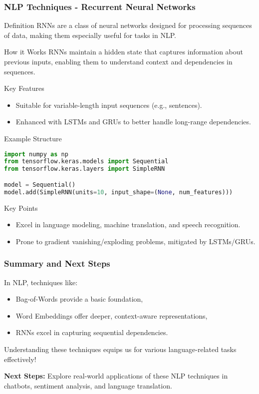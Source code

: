 \documentclass[aspectratio=169]{beamer}
\begin{document}
\begin{frame}[fragile]
  \frametitle{NLP Techniques - Recurrent Neural Networks}
  \begin{block}{Definition}
    RNNs are a class of neural networks designed for processing sequences of data, making them especially useful for tasks in NLP.
  \end{block}

  \begin{block}{How it Works}
    RNNs maintain a hidden state that captures information about previous inputs, enabling them to understand context and dependencies in sequences.
  \end{block}

  \begin{block}{Key Features}
    \begin{itemize}
      \item Suitable for variable-length input sequences (e.g., sentences).
      \item Enhanced with LSTMs and GRUs to better handle long-range dependencies.
    \end{itemize}
  \end{block}

  \begin{block}{Example Structure}
    \begin{lstlisting}[language=Python]
import numpy as np
from tensorflow.keras.models import Sequential
from tensorflow.keras.layers import SimpleRNN

model = Sequential()
model.add(SimpleRNN(units=10, input_shape=(None, num_features)))
    \end{lstlisting}
  \end{block}

  \begin{block}{Key Points}
    \begin{itemize}
      \item Excel in language modeling, machine translation, and speech recognition.
      \item Prone to gradient vanishing/exploding problems, mitigated by LSTMs/GRUs.
    \end{itemize}
  \end{block}
\end{frame}

\begin{frame}[fragile]
  \frametitle{Summary and Next Steps}
  In NLP, techniques like:
  \begin{itemize}
    \item Bag-of-Words provide a basic foundation,
    \item Word Embeddings offer deeper, context-aware representations,
    \item RNNs excel in capturing sequential dependencies.
  \end{itemize}
  Understanding these techniques equips us for various language-related tasks effectively!

  \textbf{Next Steps:} Explore real-world applications of these NLP techniques in chatbots, sentiment analysis, and language translation.
\end{frame}
\end{document}
